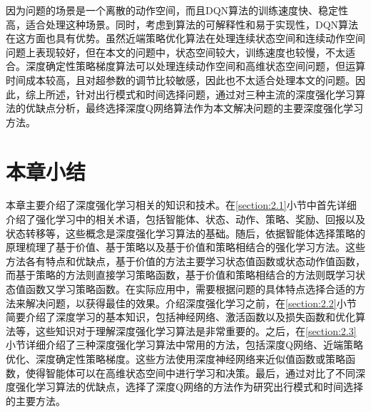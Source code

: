 因为问题的场景是一个离散的动作空间，而且DQN算法的训练速度快、稳定性高，适合处理这种场景。同时，考虑到算法的可解释性和易于实现性，DQN算法在这方面也具有优势。虽然近端策略优化算法在处理连续状态空间和连续动作空间问题上表现较好，但在本文的问题中，状态空间较大，训练速度也较慢，不太适合。深度确定性策略梯度算法可以处理连续动作空间和高维状态空间问题，但运算时间成本较高，且对超参数的调节比较敏感，因此也不太适合处理本文的问题。因此，综上所述，针对出行模式和时间选择问题，通过对三种主流的深度强化学习算法的优缺点分析，最终选择深度Q网络算法作为本文解决问题的主要深度强化学习方法。

\section{本章小结}

本章主要介绍了深度强化学习相关的知识和技术。在\ref{section:2.1}小节中首先详细介绍了强化学习中的相关术语，包括智能体、状态、动作、策略、奖励、回报以及状态转移等，这些概念是深度强化学习算法的基础。随后，依据智能体选择策略的原理梳理了基于价值、基于策略以及基于价值和策略相结合的强化学习方法。这些方法各有特点和优缺点，基于价值的方法主要学习状态值函数或状态动作值函数，而基于策略的方法则直接学习策略函数，基于价值和策略相结合的方法则既学习状态值函数又学习策略函数。在实际应用中，需要根据问题的具体特点选择合适的方法来解决问题，以获得最佳的效果。介绍深度强化学习之前，在\ref{section:2.2}小节简要介绍了深度学习的基本知识，包括神经网络、激活函数以及损失函数和优化算法等，这些知识对于理解深度强化学习算法是非常重要的。之后，在\ref{section:2.3}小节详细介绍了三种深度强化学习算法中常用的方法，包括深度Q网络、近端策略优化、深度确定性策略梯度。这些方法使用深度神经网络来近似值函数或策略函数，使得智能体可以在高维状态空间中进行学习和决策。最后，通过对比了不同深度强化学习算法的优缺点，选择了深度Q网络的方法作为研究出行模式和时间选择的主要方法。